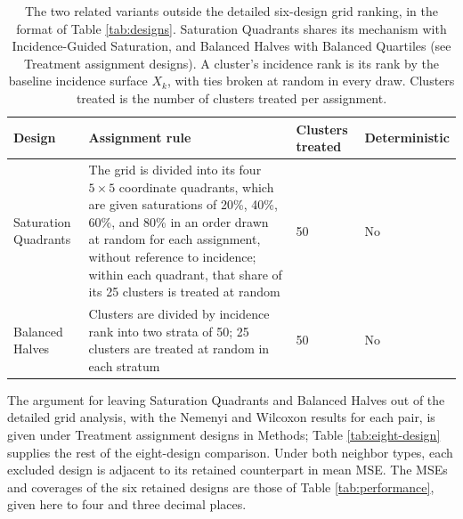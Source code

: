 \documentclass[11pt]{article}
\begin{document}
\begin{table}[!htb]

\small
\centering

\caption{The two related variants outside the detailed six-design grid ranking, in the format of Table \ref{tab:designs}. Saturation Quadrants shares its mechanism with Incidence-Guided Saturation, and Balanced Halves with Balanced Quartiles (see Treatment assignment designs). A cluster's incidence rank is its rank by the baseline incidence surface $X_k$, with ties broken at random in every draw. Clusters treated is the number of clusters treated per assignment.}
\label{tab:excluded-designs}

\begin{tabular}{p{3.4cm}p{6.4cm}p{2.0cm}p{2.3cm}}

\toprule
Design & Assignment rule & Clusters treated & Deterministic \\

\midrule
Saturation Quadrants & The grid is divided into its four $5\times5$ coordinate quadrants, which are given saturations of 20\%, 40\%, 60\%, and 80\% in an order drawn at random for each assignment, without reference to incidence; within each quadrant, that share of its 25 clusters is treated at random & 50 & No \\
Balanced Halves & Clusters are divided by incidence rank into two strata of 50; 25 clusters are treated at random in each stratum & 50 & No \\

\bottomrule

\end{tabular}

\end{table}

The argument for leaving Saturation Quadrants and Balanced Halves out of
the detailed grid analysis, with the Nemenyi and Wilcoxon results for
each pair, is given under Treatment assignment designs in Methods; Table
\ref{tab:eight-design} supplies the rest of the eight-design comparison.
Under both neighbor types, each excluded design is adjacent to its
retained counterpart in mean MSE. The MSEs and coverages of the six
retained designs are those of Table \ref{tab:performance}, given here to
four and three decimal places.
\end{document}

